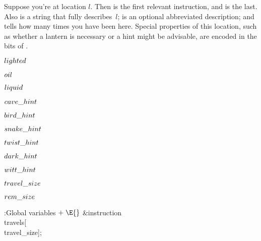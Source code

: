 Suppose you're at location $l$. Then  is the first
relevant instruction, and  is the last. Also
 is a string that fully describes~$l$; 
is an optional abbreviated description; and  tells how
many times you have been here. Special properties of this location,
such as whether a lantern is necessary or a hint might be advisable,
are encoded in the bits of .

\Y\B\4\D$\\{lighted}$ \5
\par
\B\4\D$\\{oil}$ \5
\par
\B\4\D$\\{liquid}$ \5
\par
\B\4\D$\\{cave\_hint}$ \5
\par
\B\4\D$\\{bird\_hint}$ \5
\par
\B\4\D$\\{snake\_hint}$ \5
\par
\B\4\D$\\{twist\_hint}$ \5
\par
\B\4\D$\\{dark\_hint}$ \5
\par
\B\4\D$\\{witt\_hint}$ \5
\Y\par
\B\4\D$\\{travel\_size}$ \5
\par
\B\4\D$\\{rem\_size}$ \5
\par
\Y\B\4:Global variables\X${}\mathrel+\E{}$\6
\&{instruction} \\{travels}[\\{travel\_size}];\6
